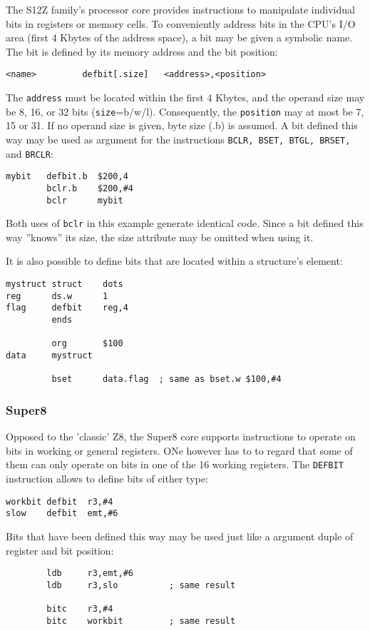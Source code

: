 \documentclass[12pt,twoside]{report}
\newcommand{\tty}[1]{{\tt #1}}
\begin{document}
The S12Z family's processor core provides instructions to manipulate
individual bits in registers or memory cells.  To conveniently
address bits in the CPU's I/O area (first 4 Kbytes of the address
space), a bit may be given a symbolic name.  The bit is defined by
its memory address and the bit position:
\begin{verbatim}
<name>         defbit[.size]   <address>,<position>
\end{verbatim}
The \tty{address} must be located within the first 4 Kbytes, and the
operand size may be 8, 16, or 32 bits (\tty{size}=b/w/l).
Consequently, the \tty{position} may at most be 7, 15 or 31.  If no
operand size is given, byte size (.b) is assumed.  A bit defined
this way may be used as argument for the instructions {\tt BCLR,
BSET, BTGL, BRSET,} and {\tt BRCLR}:
\begin{verbatim}
mybit   defbit.b  $200,4
        bclr.b    $200,#4
        bclr      mybit
\end{verbatim}
Both uses of {\tt bclr} in this example generate identical code.
Since a bit defined this way ''knows'' its size, the size attribute
may be omitted when using it.

It is also possible to define bits that are located within a
structure's element:
\begin{verbatim}
mystruct struct    dots
reg      ds.w      1
flag     defbit    reg,4
         ends

         org       $100
data     mystruct

         bset      data.flag  ; same as bset.w $100,#4
\end{verbatim}

\subsubsection{Super8}

Opposed to the 'classic' Z8, the Super8 core supports instructions to operate
on bits in working or general registers.  ONe however has to to regard that
some of them can only operate on bits in one of the 16 working registers.
The \tty{DEFBIT} instruction allows to define bits of either type:
\begin{verbatim}
workbit defbit  r3,#4
slow    defbit  emt,#6
\end{verbatim}
Bits that have been defined this way may be used just like a argument duple of
register and bit position:
\begin{verbatim}
        ldb     r3,emt,#6
        ldb     r3,slo          ; same result

        bitc    r3,#4
        bitc    workbit         ; same result
\end{verbatim}
\end{document}
